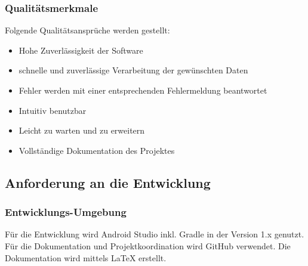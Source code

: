 \subsubsection{Qualitätsmerkmale}
Folgende Qualitätsansprüche werden gestellt:
\begin{itemize}
	\item Hohe Zuverlässigkeit der Software
	\item schnelle und zuverlässige Verarbeitung der gewünschten Daten
	\item Fehler werden mit einer entsprechenden Fehlermeldung beantwortet
	\item Intuitiv benutzbar
	\item Leicht zu warten und zu erweitern
	\item Vollständige Dokumentation des Projektes
\end{itemize}


\subsection{\textbf{Anforderung an die Entwicklung}}

\subsubsection{Entwicklungs-Umgebung}
Für die Entwicklung wird Android Studio inkl. Gradle in der Version 1.x genutzt. Für die Dokumentation und Projektkoordination wird GitHub verwendet.
Die Dokumentation wird mittels \LaTeX{} erstellt.



%
%
%
%
%


